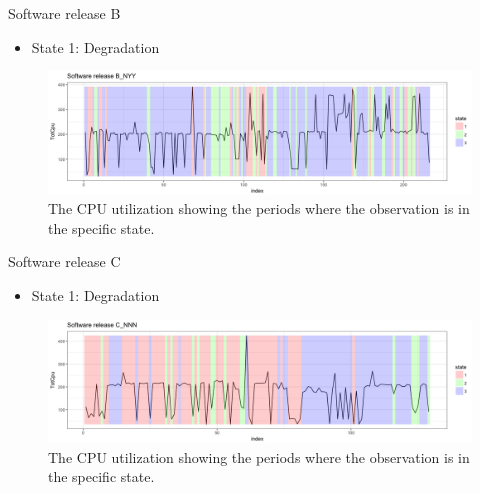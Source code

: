 \documentclass{beamer}
\begin{document}
\begin{frame}
Software release B

\begin{itemize}
	\item State 1: Degradation
\end{itemize}

\begin{figure}
	\includegraphics[width=1\linewidth]{L16B_NYY1}
	\caption{The CPU utilization showing the periods where the observation is in the specific state.}
\end{figure}

\end{frame}

\begin{frame}
Software release C

\begin{itemize}
	\item State 1: Degradation
\end{itemize}

\begin{figure}
	\includegraphics[width=1\linewidth]{L17A_NNN1}
	\caption{The CPU utilization showing the periods where the observation is in the specific state.}
\end{figure}

\end{frame}
\end{document}
